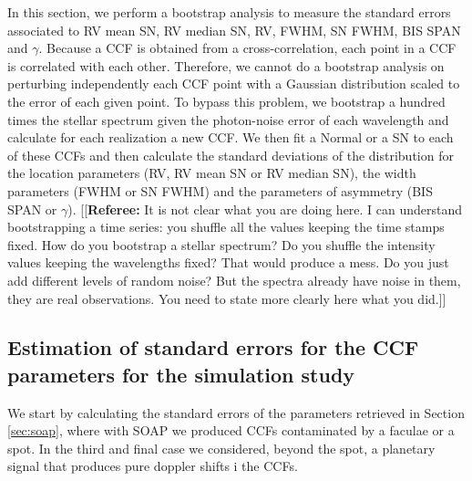 \documentclass[11pt, oneside]{article}
\newcommand{\comment}[1]{{\color{red}[[\textbf{Referee: }#1]]}}
\begin{document}
In this section, we perform a bootstrap analysis to measure the standard errors associated to RV mean SN, RV median SN, RV, FWHM, SN FWHM, BIS SPAN and $\gamma$. Because a CCF is obtained from a cross-correlation, each point in a CCF is correlated with each other. Therefore, we cannot do a bootstrap analysis on perturbing independently each CCF point with a Gaussian distribution scaled to the error of each given point. To bypass this problem, we bootstrap a hundred times the stellar spectrum given the photon-noise error of each wavelength and calculate for each realization a new CCF. We then fit a Normal or a SN to each of these CCFs and then calculate the standard deviations of the distribution for the location parameters (RV, RV mean SN or RV median SN), the width parameters (FWHM or SN FWHM) and the parameters of asymmetry (BIS SPAN or $\gamma$).
\comment{It is not clear what you are doing here. I can understand bootstrapping a time series: you shuffle all the values keeping the time stamps fixed. How do you bootstrap a stellar spectrum? Do you shuffle the intensity values keeping the wavelengths fixed? That would produce a mess. Do you just add different levels of random noise? But the spectra already have noise in them, they are real observations. You need to state more clearly here what you did.}

\subsection{Estimation of standard errors for the CCF parameters for the simulation study} \label{sec:bootstrap_soap}

We start by calculating the standard errors of the parameters retrieved in Section \ref{sec:soap}, where with SOAP we produced CCFs contaminated by a faculae or a spot. In the third and final case we considered, beyond the spot, a planetary signal that produces pure doppler shifts i the CCFs.
\end{document}

